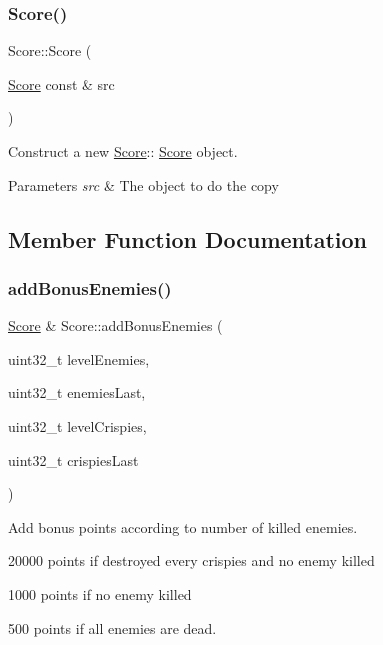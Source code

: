 \subsubsection{\texorpdfstring{Score()}{Score()}\hspace{0.1cm}{\footnotesize\ttfamily [2/2]}}
{\footnotesize\ttfamily Score\+::\+Score (\begin{DoxyParamCaption}\item[{\hyperlink{class_score}{Score} const \&}]{src }\end{DoxyParamCaption})}



Construct a new \hyperlink{class_score}{Score}\+:\+: \hyperlink{class_score}{Score} object. 


\begin{DoxyParams}{Parameters}
{\em src} & The object to do the copy \\
\hline
\end{DoxyParams}


\subsection{Member Function Documentation}
\mbox{\label{class_score_a8b9bb1db9ddc8144378adfd81c6899aa}} 
\subsubsection{\texorpdfstring{add\+Bonus\+Enemies()}{addBonusEnemies()}}
{\footnotesize\ttfamily \hyperlink{class_score}{Score} \& Score\+::add\+Bonus\+Enemies (\begin{DoxyParamCaption}\item[{uint32\+\_\+t}]{level\+Enemies,  }\item[{uint32\+\_\+t}]{enemies\+Last,  }\item[{uint32\+\_\+t}]{level\+Crispies,  }\item[{uint32\+\_\+t}]{crispies\+Last }\end{DoxyParamCaption})}



Add bonus points according to number of killed enemies. 


\begin{DoxyItemize}
\item 20000 points if destroyed every crispies and no enemy killed
\item 1000 points if no enemy killed
\item 500 points if all enemies are dead.
\end{DoxyItemize}


